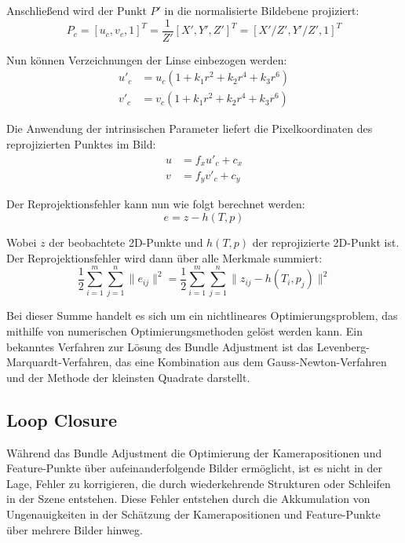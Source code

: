 Anschließend wird der Punkt \( P' \) in die normalisierte Bildebene projiziert:
\begin{equation}
    P_c = [u_c, v_c, 1]^T = \frac{1}{Z'}[X', Y', Z']^T = [X'/Z', Y'/Z', 1]^T
\end{equation}

Nun können Verzeichnungen der Linse einbezogen werden:
\begin{equation}
    \begin{aligned}
        u'_c &= u_c(1 + k_1r^2 + k_2r^4 + k_3r^6) \\
        v'_c &= v_c(1 + k_1r^2 + k_2r^4 + k_3r^6)
    \end{aligned}
\end{equation}

Die Anwendung der intrinsischen Parameter liefert die Pixelkoordinaten des reprojizierten Punktes im Bild:
\begin{equation}
    \begin{aligned}
        u &= f_xu'_c + c_x \\
        v &= f_yv'_c + c_y
    \end{aligned}
\end{equation}

Der Reprojektionsfehler kann nun wie folgt berechnet werden:
\begin{equation}
    e = z - h(T,p)
\end{equation}

Wobei \( z \) der beobachtete 2D-Punkte und \( h(T,p) \) der reprojizierte 2D-Punkt ist. Der Reprojektionsfehler wird dann über alle Merkmale summiert:
\begin{equation}
    \frac{1}{2} \sum_{i=1}^{m} \sum_{j=1}^{n} \| e_{ij} \|^2 = \frac{1}{2} \sum_{i=1}^{m} \sum_{j=1}^{n} \| z_{ij} - h(T_i, p_j) \|^2
\end{equation}

Bei dieser Summe handelt es sich um ein nichtlineares Optimierungsproblem, das mithilfe von numerischen Optimierungsmethoden gelöst werden kann. Ein bekanntes Verfahren zur Lösung des Bundle Adjustment ist das Levenberg-Marquardt-Verfahren, das eine Kombination aus dem Gauss-Newton-Verfahren und der Methode der kleinsten Quadrate darstellt. \cite{gao2021vSLAM}

\subsection{Loop Closure}

Während das Bundle Adjustment die Optimierung der Kamerapositionen und Feature-Punkte über aufeinanderfolgende Bilder ermöglicht, ist es nicht in der Lage, Fehler zu korrigieren, die durch wiederkehrende Strukturen oder Schleifen in der Szene entstehen. Diese Fehler entstehen durch die Akkumulation von Ungenauigkeiten in der Schätzung der Kamerapositionen und Feature-Punkte über mehrere Bilder hinweg. \cite{gao2021vSLAM, cadena2016slam}

